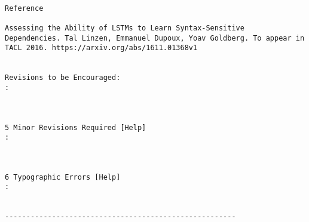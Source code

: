 \begin{verbatim}

Reference

Assessing the Ability of LSTMs to Learn Syntax-Sensitive
Dependencies. Tal Linzen, Emmanuel Dupoux, Yoav Goldberg. To appear in
TACL 2016. https://arxiv.org/abs/1611.01368v1


Revisions to be Encouraged:
: 



5 Minor Revisions Required [Help]
: 



6 Typographic Errors [Help]
: 


------------------------------------------------------
\end{verbatim}
